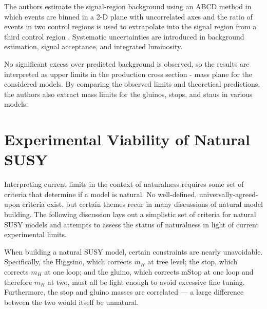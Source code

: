 \documentclass[12pt]{article}
\begin{document}
    The authors estimate the signal-region background using an ABCD method in which events are binned in a 2-D plane with uncorrelated axes and the ratio of events in two control regions is used to extrapolate into the signal region from a third control region . Systematic uncertainties are introduced in background estimation, signal acceptance, and integrated luminosity.

    No significant excess over predicted background is observed, so the results are interpreted as upper limits in the production cross section - mass plane for the considered models. By comparing the observed limits and theoretical predictions, the authors also extract mass limits for the gluinos, stops, and staus in various models. 

\section{Experimental Viability of Natural SUSY}
      
    Interpreting current limits in the context of naturalness requires some set of criteria that determine if a model is natural. No well-defined, universally-agreed-upon criteria exist, but certain themes recur in many discussions of natural model building. The following discussion lays out a simplistic set of criteria for natural SUSY models and attempts to assess the status of naturalness in light of current experimental limits.
    
    When building a natural SUSY model, certain constraints are nearly unavoidable. Specifically, the Higgsino, which corrects $m_H$ at tree level; the stop, which corrects $m_H$ at one loop; and the gluino, which corrects mStop at one loop and therefore $m_H$ at two, must all be light enough to avoid excessive fine tuning. Furthermore, the stop and gluino masses are correlated --- a large difference between the two would itself be unnatural.
\end{document}
